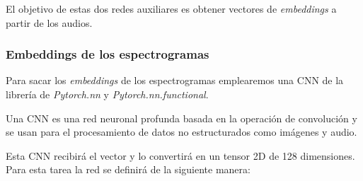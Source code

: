 El objetivo de estas dos redes auxiliares es obtener vectores de \textit{embeddings} a partir de los audios.

\subsubsection*{Embeddings de los espectrogramas}

Para sacar los \textit{embeddings} de los espectrogramas emplearemos una CNN de la librería de \textit{Pytorch.nn} y \textit{Pytorch.nn.functional}.

Una CNN es una red neuronal profunda basada en la operación de convolución y se usan para el procesamiento de datos no estructurados como imágenes y audio.

Esta CNN recibirá el vector y lo convertirá en un tensor 2D de 128 dimensiones. Para esta tarea la red se definirá de la siguiente manera:

